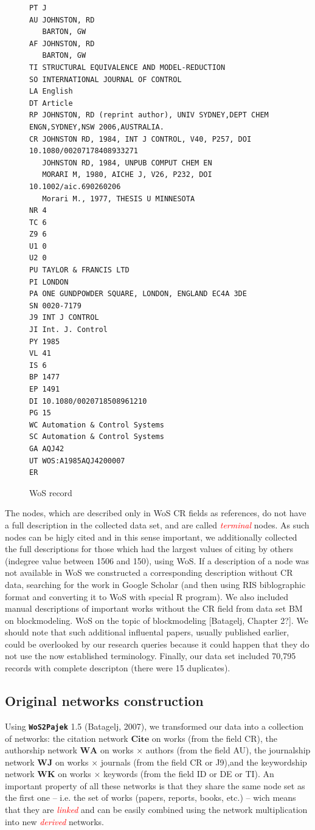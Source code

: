 \documentclass[11pt]{article} %
\newcommand{\WoSPajek}{\texttt{\textbf{WoS2Pajek}}\xspace}
\newcommand{\keyw}[1]{\textcolor{red}{\emph{#1}}}
\newcommand{\WA}{\mathbf{W\!\!A}}
\newcommand{\WK}{\mathbf{W\!K}}
\newcommand{\WJ}{\mathbf{W\!J}}
\newcommand{\Ci}{\mathbf{Cite}}
\begin{document}
\begin{figure}
\renewcommand{\baselinestretch}{0.8}
\scriptsize
\begin{verbatim}
PT J
AU JOHNSTON, RD
   BARTON, GW
AF JOHNSTON, RD
   BARTON, GW
TI STRUCTURAL EQUIVALENCE AND MODEL-REDUCTION
SO INTERNATIONAL JOURNAL OF CONTROL
LA English
DT Article
RP JOHNSTON, RD (reprint author), UNIV SYDNEY,DEPT CHEM ENGN,SYDNEY,NSW 2006,AUSTRALIA.
CR JOHNSTON RD, 1984, INT J CONTROL, V40, P257, DOI 10.1080/00207178408933271
   JOHNSTON RD, 1984, UNPUB COMPUT CHEM EN
   MORARI M, 1980, AICHE J, V26, P232, DOI 10.1002/aic.690260206
   Morari M., 1977, THESIS U MINNESOTA
NR 4
TC 6
Z9 6
U1 0
U2 0
PU TAYLOR & FRANCIS LTD
PI LONDON
PA ONE GUNDPOWDER SQUARE, LONDON, ENGLAND EC4A 3DE
SN 0020-7179
J9 INT J CONTROL
JI Int. J. Control
PY 1985
VL 41
IS 6
BP 1477
EP 1491
DI 10.1080/0020718508961210
PG 15
WC Automation & Control Systems
SC Automation & Control Systems
GA AQJ42
UT WOS:A1985AQJ4200007
ER
\end{verbatim}
\caption{WoS record}\label{wos}
\end{figure}

The nodes, which are described only in WoS CR fields as references, do not have a full description in the collected data set, and are called \keyw{terminal} nodes. As such nodes can be higly cited and in this sense important, we additionally collected the full descriptions for those which had the  largest values of citing by others (indegree value between 1506 and 150), using WoS. If a description of a node was not available in WoS we constructed a corresponding description without CR data, searching for the work in Google Scholar (and then using RIS biblographic format and converting it to WoS with special R program). We also included manual descriptions of important works without the CR field from data set BM on blockmodeling. WoS on the topic of blockmodeling [Batagelj, Chapter 2?]. We should note that such additional influental papers, usually published earlier, could be overlooked by our research queries because it could happen that they do not use the now established terminology. Finally, our data set included 70,795 records with complete descripton (there were 15 duplicates).  \medskip

\subsection{Original networks construction}

Using \WoSPajek 1.5  (Batagelj, 2007), we transformed our data into a collection of networks: the citation network $\Ci$ on works (from the field CR), the authorship network $\WA$ on works $\times$ authors  (from the field AU),  the journalship network $\WJ$ on  works $\times$ journals  (from the field CR or J9),and the keywordship network $\WK$ on works  $\times$ keywords (from the field ID or DE or TI). An important property of all these networks is that they share the same node set as the first one -- i.e. the set of works (papers, reports, books, etc.) -- wich means that they are \keyw{linked} and can be easily combined using the network multiplication into new \keyw{derived}  networks. \medskip
\end{document}
